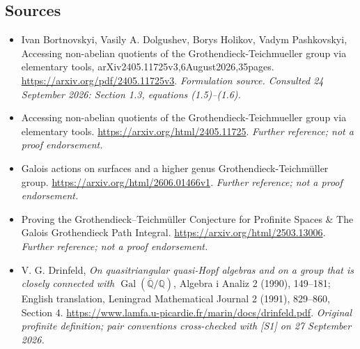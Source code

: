 \documentclass[11pt]{article}
\begin{document}
\subsection{Sources}
\begin{itemize}
\item[S1]Ivan Bortnovskyi, Vasily A. Dolgushev, Borys Holikov, Vadym Pashkovskyi, Accessing non-abelian quotients of the Grothendieck-Teichmueller group via elementary tools, arXiv2405.11725v3,6August2026,35pages.
\url{https://arxiv.org/pdf/2405.11725v3}.
\textit{Formulation source. Consulted 24 September 2026: Section 1.3, equations (1.5)--(1.6).}
\item[S2]Accessing non-abelian quotients of the Grothendieck-Teichmueller group via elementary tools.
\url{https://arxiv.org/html/2405.11725}.
\textit{Further reference; not a proof endorsement.}
\item[S3]Galois actions on surfaces and a higher genus Grothendieck-Teichmüller group.
\url{https://arxiv.org/html/2606.01466v1}.
\textit{Further reference; not a proof endorsement.}
\item[S4]Proving the Grothendieck–Teichmüller Conjecture for Profinite Spaces \& The Galois Grothendieck Path Integral.
\url{https://arxiv.org/html/2503.13006}.
\textit{Further reference; not a proof endorsement.}
\item[E1]V. G. Drinfeld, \emph{On quasitriangular quasi-Hopf algebras and on a group that is closely connected with $\operatorname{Gal}(\overline{\mathbb Q}/\mathbb Q)$}, Algebra i Analiz 2 (1990), 149--181; English translation, Leningrad Mathematical Journal 2 (1991), 829--860, Section 4.
\url{https://www.lamfa.u-picardie.fr/marin/docs/drinfeld.pdf}.
\textit{Original profinite definition; pair conventions cross-checked with [S1] on 27 September 2026.}
\end{itemize}
\end{document}
